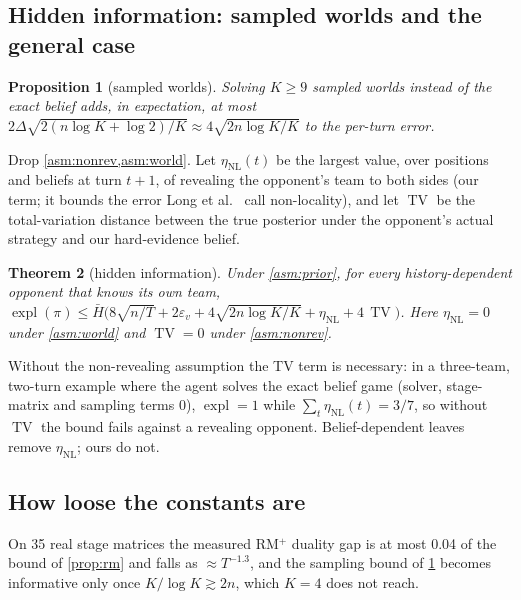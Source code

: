 \documentclass[10pt]{article}
\theoremstyle{plain}
\newtheorem{theorem}{Theorem}
\newtheorem{proposition}[theorem]{Proposition}
\theoremstyle{definition}
\theoremstyle{remark}
\newcommand{\Hbar}{\bar H}
\newcommand{\epsv}{\varepsilon_v}
\newcommand{\etaNL}{\eta_{\mathrm{NL}}}
\DeclareMathOperator{\expl}{expl}
\DeclareMathOperator{\TV}{TV}
\begin{document}
\subsection{Hidden information: sampled worlds and the general case}
\label{sec:general}
\begin{proposition}[sampled worlds]\label{prop:K}
Solving $K\ge9$ sampled worlds instead of the exact belief adds, in expectation, at most $2\Delta\sqrt{2(n\log K+\log2)/K}\approx4\sqrt{2n\log K/K}$ to the per-turn error.
\end{proposition}
Drop \cref{asm:nonrev,asm:world}. Let $\etaNL(t)$ be the largest value, over positions and beliefs at turn $t+1$, of revealing the opponent's team to both sides (our term; it bounds the error Long et al.~\cite{Lon10} call non-locality), and let $\TV$ be the total-variation distance between the true posterior under the opponent's actual strategy and our hard-evidence belief.
\begin{theorem}[hidden information]\label{thm:C}
Under \cref{asm:prior}, for every history-dependent opponent that knows its own team,
$\expl(\pi)\le\Hbar\big(8\sqrt{n/T}+2\epsv+4\sqrt{2n\log K/K}+\etaNL+4\,\TV\big)$. Here $\etaNL=0$ under \cref{asm:world} and $\TV=0$ under \cref{asm:nonrev}.
\end{theorem}
Without the non-revealing assumption the TV term is necessary: in a three-team, two-turn example where the agent solves the exact belief game (solver, stage-matrix and sampling terms 0), $\expl=1$ while $\sum_t\etaNL(t)=3/7$, so without $\TV$ the bound fails against a revealing opponent. Belief-dependent leaves~\cite{CFRD,Mor17,Bro20} remove $\etaNL$; ours do not.

\subsection{How loose the constants are}
\label{app:const}
On 35 real stage matrices the measured RM$^+$ duality gap is at most 0.04 of the bound of \cref{prop:rm} and falls as $\approx T^{-1.3}$, and the sampling bound of \cref{prop:K} becomes informative only once $K/\log K\gtrsim2n$, which $K=4$ does not reach.
\end{document}
